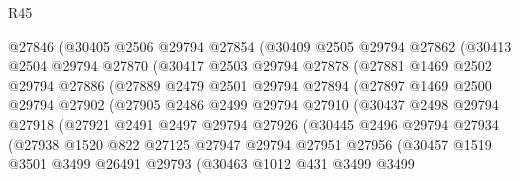 \begin{lexlean}{R45}
\begin{coremodule}
                @27846
                (@30405
                  @2506
                  @29794
                  @27854
                  (@30409
                    @2505
                    @29794
                    @27862
                    (@30413
                      @2504
                      @29794
                      @27870
                      (@30417
                        @2503
                        @29794
                        @27878
                        (@27881
                          @1469
                          @2502
                          @29794
                          @27886
                          (@27889
                            @2479
                            @2501
                            @29794
                            @27894
                            (@27897
                              @1469
                              @2500
                              @29794
                              @27902
                              (@27905
                                @2486
                                @2499
                                @29794
                                @27910
                                (@30437
                                  @2498
                                  @29794
                                  @27918
                                  (@27921
                                    @2491
                                    @2497
                                    @29794
                                    @27926
                                    (@30445
                                      @2496
                                      @29794
                                      @27934
                                      (@27938
                                        @1520
                                        @822
                                        @27125
                                        @27947
                                        @29794
                                        @27951
                                        @27956
                                        (@30457
                                          @1519
                                          @3501
                                          @3499
                                          @26491
                                          @29793
                                          (@30463
                                            @1012
                                            @431
                                            @3499
                                            @3499

\end{coremodule}
\end{lexlean}

